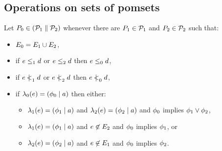 \subsection{Operations on sets of pomsets}
\label{app:sets-of-pomsets}

\begin{definition}
Let $P_0 \in (\mathcal{P}_1 \parallel \mathcal{P}_2)$
whenever there are $P_1 \in \mathcal{P}_1$ and $P_2 \in \mathcal{P}_2$ such that:
\begin{itemize}
\item $E_0 = E_1 \cup E_2$,
\item if $e \le_1 d$ or $e \le_2 d$ then $e \le_0 d$,
\item if $e \mathrel{\,\mid\!\!\!<}_1 d$ or $e \mathrel{\,\mid\!\!\!<}_2 d$ then $e \mathrel{\,\mid\!\!\!<}_0 d$,
\item if $\lambda_0(e) = (\phi_0 \mid a)$ then either:
  \begin{itemize}
  \item $\lambda_1(e) = (\phi_1 \mid a)$ and $\lambda_2(e) = (\phi_2 \mid a)$
    and $\phi_0$ implies $\phi_1 \lor \phi_2$,
  \item $\lambda_1(e) = (\phi_1 \mid a)$ and $e \not\in E_2$
    and $\phi_0$ implies $\phi_1$, or
  \item $\lambda_2(e) = (\phi_2 \mid a)$ and $e \not\in E_1$
    and $\phi_0$ implies $\phi_2$.
  \end{itemize}
\end{itemize}
\end{definition}

